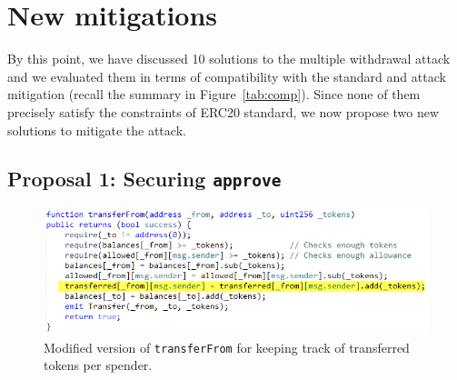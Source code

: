 
\section{New mitigations}

By this point, we have discussed 10 solutions to the multiple withdrawal attack and we evaluated them in terms of compatibility with the standard and attack mitigation (recall the summary in Figure~\ref{tab:comp}). Since none of them precisely satisfy the constraints of ERC20 standard, we now propose two new solutions to mitigate the attack.


\subsection{Proposal 1: Securing \texttt{approve}}
\label{sec:proposal1}

\begin{figure}[t]
	\centering
	\includegraphics[width=1.0\linewidth]{figures/multiple_withdrawal_14.png}
	\caption{Modified version of \texttt{transferFrom} for keeping track of transferred tokens per spender.\label{fig:transfer1}}
\end{figure}


